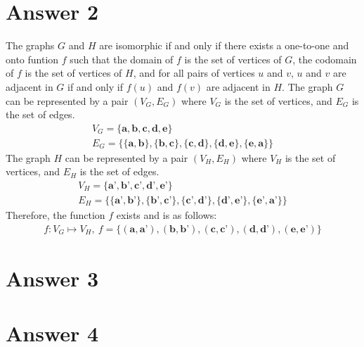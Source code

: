 \documentclass[12pt]{article}
\begin{document}
\section*{Answer 2}

The graphs $G$ and $H$ are isomorphic if and only if there exists a one-to-one and onto funtion $f$ such that the domain of $f$ is the set of vertices of $G$, the codomain of $f$ is the set of vertices of $H$, and for all pairs of vertices $u$ and $v$, $u$ and $v$ are adjacent in $G$ if and only if $f(u)$ and $f(v)$ are adjacent in $H$.
\newline
The graph $G$ can be represented by a pair $(V_G, E_G)$ where $V_G$ is the set of vertices, and $E_G$ is the set of edges.
\begin{gather*}
V_G = \{\textbf{a}, \textbf{b}, \textbf{c}, \textbf{d}, \textbf{e}\} \\
E_G = \{\{\textbf{a}, \textbf{b}\}, \{\textbf{b}, \textbf{c}\}, \{\textbf{c}, \textbf{d}\}, \{\textbf{d}, \textbf{e}\}, \{\textbf{e}, \textbf{a}\}\}
\end{gather*}
The graph $H$ can be represented by a pair $(V_H, E_H)$ where $V_H$ is the set of vertices, and $E_H$ is the set of edges.
\begin{gather*}
V_H = \{\textbf{a'}, \textbf{b'}, \textbf{c'}, \textbf{d'}, \textbf{e'}\} \\
E_H = \{\{\textbf{a'}, \textbf{b'}\}, \{\textbf{b'}, \textbf{c'}\}, \{\textbf{c'}, \textbf{d'}\}, \{\textbf{d'}, \textbf{e'}\}, \{\textbf{e'}, \textbf{a'}\}\}
\end{gather*}
Therefore, the function $f$ exists and is as follows:
\begin{gather*}
f:V_G \mapsto V_H,\ f = \{(\textbf{a}, \textbf{a'}), (\textbf{b}, \textbf{b'}), (\textbf{c}, \textbf{c'}), (\textbf{d}, \textbf{d'}), (\textbf{e}, \textbf{e'})\}
\end{gather*}

\newpage

\section*{Answer 3}


\section*{Answer 4}
\end{document}
